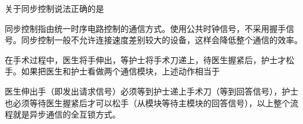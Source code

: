 \question 关于同步控制说法正确的是
\par{}
\begin{solution}同步控制指由统一时序电路控制的通信方式。使用公共时钟信号，不采用握手信号。同步控制一般不允许连接速度差别较大的设备，这样会降低整个通信的效率。
\end{solution}
\question 在手术过程中，医生将手伸出，等护士将手术刀递上，待医生握紧后，护士才松手。如果把医生和护士看做两个通信模块，上述动作相当于
\par{}
\begin{solution}医生伸出手（即发出请求信号）必须等到护士递上手术刀（等到回答信号），护士也必须等待医生握紧后才可以松手（从模块等待主模块的回答信号），以上整个流程就是异步通信的全互锁方式。
\end{solution}
